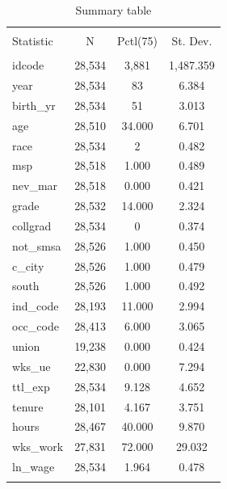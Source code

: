 \documentclass[
  12pt,
]{article}
\begin{document}
\begin{table}[ht] \centering 
  \caption{Summary table} 
  \label{tab23} 
\begin{tabular}{@{\extracolsep{5pt}}lccc} 
\\[-1.8ex]\hline 
\hline \\[-1.8ex] 
Statistic & \multicolumn{1}{c}{N} & \multicolumn{1}{c}{Pctl(75)} & \multicolumn{1}{c}{St. Dev.} \\ 
\hline \\[-1.8ex] 
idcode & 28,534 & 3,881 & 1,487.359 \\ 
year & 28,534 & 83 & 6.384 \\ 
birth\_yr & 28,534 & 51 & 3.013 \\ 
age & 28,510 & 34.000 & 6.701 \\ 
race & 28,534 & 2 & 0.482 \\ 
msp & 28,518 & 1.000 & 0.489 \\ 
nev\_mar & 28,518 & 0.000 & 0.421 \\ 
grade & 28,532 & 14.000 & 2.324 \\ 
collgrad & 28,534 & 0 & 0.374 \\ 
not\_smsa & 28,526 & 1.000 & 0.450 \\ 
c\_city & 28,526 & 1.000 & 0.479 \\ 
south & 28,526 & 1.000 & 0.492 \\ 
ind\_code & 28,193 & 11.000 & 2.994 \\ 
occ\_code & 28,413 & 6.000 & 3.065 \\ 
union & 19,238 & 0.000 & 0.424 \\ 
wks\_ue & 22,830 & 0.000 & 7.294 \\ 
ttl\_exp & 28,534 & 9.128 & 4.652 \\ 
tenure & 28,101 & 4.167 & 3.751 \\ 
hours & 28,467 & 40.000 & 9.870 \\ 
wks\_work & 27,831 & 72.000 & 29.032 \\ 
ln\_wage & 28,534 & 1.964 & 0.478 \\ 
\hline \\[-1.8ex] 
\end{tabular} 
\end{table}
\end{document}
